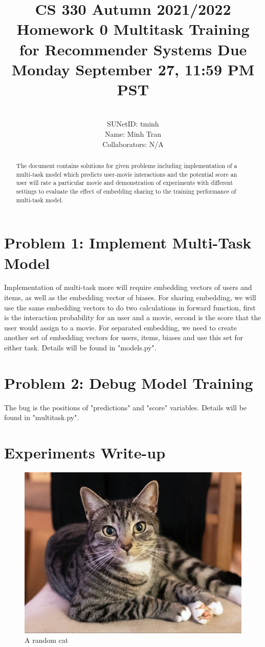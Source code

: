 \documentclass[]{article}
\title{\textbf{CS 330 Autumn 2021/2022 Homework 0}
	{Multitask Training for Recommender Systems
		Due Monday September 27, 11:59 PM PST}}
\author{
			\\SUNetID: tminh 
			\\Name: Minh Tran 
			\\Collaborators: N/A 
		}
\begin{document}
	
	\maketitle
	
	\begin{abstract}
		
		The document contains solutions for given problems including implementation of a multi-task model which predicts user-movie interactions and the potential score an user will rate a particular movie and demonstration of experiments with different settings to evaluate the effect of embedding sharing to the training performance of multi-task model.
		
	\end{abstract}
	
	\section{Problem 1: Implement Multi-Task Model}
	Implementation of multi-task more will require embedding vectors of users and items, as well as the embedding vector of biases. For sharing embedding, we will use the same embedding vectors to do two calculations in forward function, first is the interaction probability for an user and a movie, second is the score that the user would assign to a movie. For separated embedding, we need to create another set of embedding vectors for users, items, biases and use this set for either task.
	Details will be found in "models.py".	
	
	\section{Problem 2: Debug Model Training}
	The bug is the positions of "predictions" and "score" variables. 
	Details will be found in "multitask.py".
	
	\section{Experiments Write-up}
	
	\begin{center} 
		\begin{figure}[H]
			\centering
			\includegraphics[width=0.5\linewidth]{cat}
			\caption{A random cat}
		\end{figure}	
	\end{center}
	
\end{document}
